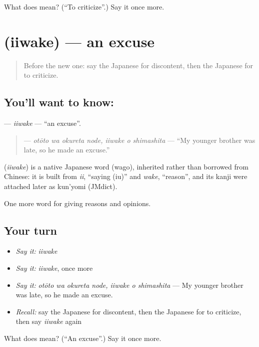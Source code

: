 \begin{tcolorbox}[breakable,colback=teal!4,colframe=teal!35!black,title={Before you move on}]
What does  mean? (\textquotedblleft{}To criticize\textquotedblright{}.) Say it once more.
\end{tcolorbox}
\section[\texorpdfstring{\ja{いいわけ} (iiwake)}{いいわけ (iiwake)}]{ (iiwake) — an excuse}

\label{lesson:JA-C324-iiwake}



\begin{quote}
Before the new one: say the Japanese for discontent, then the Japanese for to criticize.
\end{quote}

\subsection*{You'll want to know: }
\textbf{} — \emph{iiwake} — \textquotedblleft{}an excuse\textquotedblright{}.

\begin{quote}
\textbf{  } — \emph{otōto wa okureta node, iiwake o shimashita} — \textquotedblleft{}My younger brother was late, so he made an excuse.\textquotedblright{}
\end{quote}

\begin{cousinweb}
\textbf{} (\emph{iiwake}) is a native Japanese word (wago), inherited rather than borrowed from Chinese: it is built from \emph{ii}, \textquotedblleft{}saying (iu)\textquotedblright{} and \emph{wake}, \textquotedblleft{}reason\textquotedblright{}, and its kanji were attached later as kun'yomi (JMdict).
\end{cousinweb}

\begin{grammarlens}[title={What you've built}]
One more word for giving reasons and opinions.
\end{grammarlens}

\subsection*{Your turn}
\begin{itemize}
\raggedright
  \item \emph{Say it:} \emph{iiwake}
  \item \emph{Say it:} \emph{iiwake}, once more
  \item \emph{Say it:} \emph{otōto wa okureta node, iiwake o shimashita} — My younger brother was late, so he made an excuse.
  \item \emph{Recall:} say the Japanese for discontent, then the Japanese for to criticize, then say \emph{iiwake} again
\end{itemize}

\begin{tcolorbox}[breakable,colback=teal!4,colframe=teal!35!black,title={Before you move on}]
What does  mean? (\textquotedblleft{}An excuse\textquotedblright{}.) Say it once more.
\end{tcolorbox}

